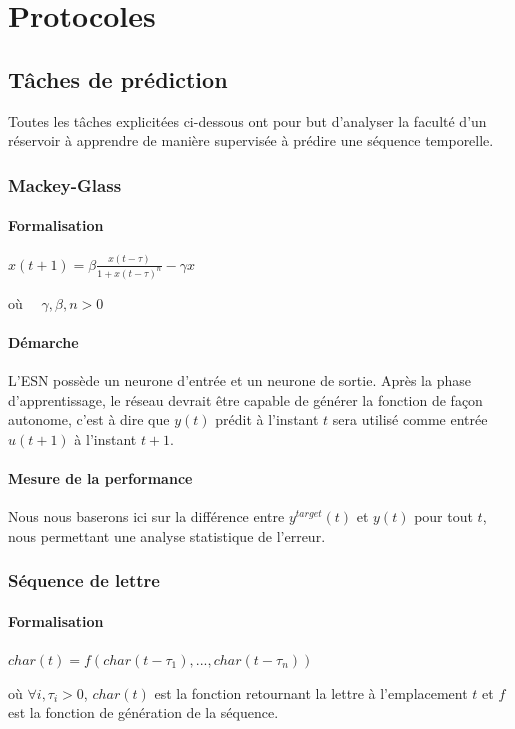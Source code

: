 \documentclass[12pt]{article}
\begin{document}
\section{Protocoles}

\subsection{Tâches de prédiction}

Toutes les tâches explicitées ci-dessous ont pour but d'analyser la faculté d'un réservoir à apprendre de manière supervisée à prédire une séquence temporelle.

\subsubsection{Mackey-Glass}
\paragraph{Formalisation}
\begin{center}
$x(t+1) = \beta \frac{ x(t-\tau) }{ 1+{x(t-\tau)}^n }-\gamma x$
\end{center}
où $\quad \gamma,\beta,n > 0$
\paragraph{Démarche}
L'ESN possède un neurone d'entrée et un neurone de sortie. Après la phase d'apprentissage, le réseau devrait être capable de générer la fonction de façon autonome, c'est à dire que $y(t)$ prédit à l'instant $t$ sera utilisé comme entrée $u(t+1)$ à l'instant $t+1$.
\paragraph{Mesure de la performance}
Nous nous baserons ici sur la différence entre $y^{target}(t)$ et $y(t)$ pour tout $t$, nous permettant une analyse statistique de l'erreur.


\subsubsection{Séquence de lettre}
\paragraph{Formalisation}
\begin{center}
$char(t) = f( char(t-\tau_{1}),..., char(t-\tau_{n}) )$
\end{center}
où $\forall i, \tau_{i} > 0$, $char(t)$ est la fonction retournant la lettre à l'emplacement $t$ et $f$ est la fonction de génération de la séquence.
\end{document}
